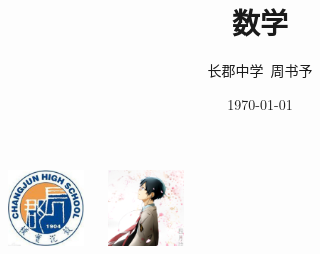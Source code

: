 \documentclass{beamer}
\title{数学}
\author{长郡中学\ 周书予}
\date{\today}
\begin{document}
\small
	
	\begin{frame}
	\titlepage
		\begin{center}
		\includegraphics[width=2.0cm]{cj.jpg}
		$\ \ \ \ \ $
		\includegraphics[width=2.0cm]{zsy.png}
		\end{center}
	\end{frame}
\end{document}

